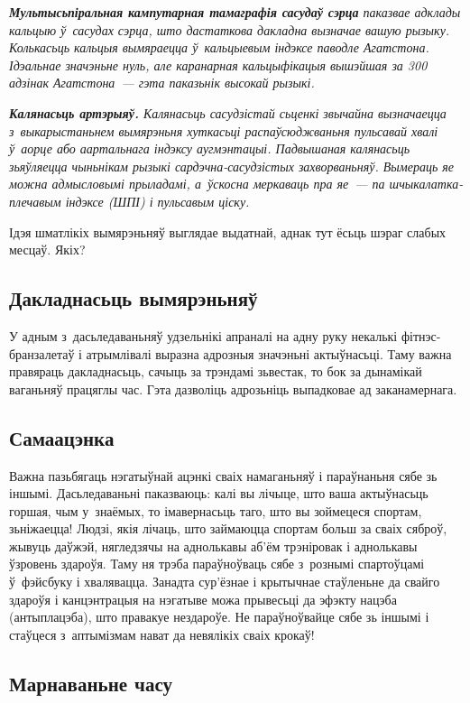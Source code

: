 \emph{\textbf{Мультысьпіральная кампутарная тамаграфія сасудаў сэрца} паказвае адклады кальцыю ў~сасудах сэрца, што дастаткова дакладна вызначае вашую рызыку. Колькасьць кальцыя вымяраецца ў~кальцыевым індэксе паводле Агатстона. Ідэальнае значэньне нуль, але каранарная кальцыфікацыя вышэйшая за 300 адзінак Агатстона~--- гэта паказьнік высокай рызыкі.}

\emph{\textbf{Калянасьць артэрыяў.} Калянасьць сасудзістай сьценкі звычайна вызначаецца з~выкарыстаньнем вымярэньня хуткасьці распаўсюджваньня пульсавай хвалі ў~аорце або аартальнага індэксу аугмэнтацыі. Падвышаная калянасьць зьяўляецца чыньнікам рызыкі сардэчна-сасудзістых захворваньняў. Вымераць яе можна адмысловымі прыладамі, а~ўскосна меркаваць пра яе~--- па шчыкалатка-плечавым індэксе (ШПІ) і пульсавым ціску.}

Ідэя шматлікіх вымярэньняў выглядае выдатнай, аднак тут ёсьць шэраг слабых месцаў. Якіх?

\subsection*{Дакладнасьць вымярэньняў}

У адным з~дасьледаваньняў удзельнікі апраналі на адну руку некалькі фітнэс-бранзалетаў і атрымлівалі выразна адрозныя значэньні актыўнасьці. Таму важна правяраць дакладнасьць, сачыць за трэндамі зьвестак, то бок за дынамікай ваганьняў працяглы час. Гэта дазволіць адрозьніць выпадковае ад заканамернага.

\subsection*{Самаацэнка}

Важна пазьбягаць нэгатыўнай ацэнкі сваіх намаганьняў і параўнаньня сябе зь іншымі. Дасьледаваньні паказваюць: калі вы лічыце, што ваша актыўнасьць горшая, чым у~знаёмых, то імавернасьць таго, што вы зоймецеся спортам, зьніжаецца! Людзі, якія лічаць, што займаюцца спортам больш за сваіх сяброў, жывуць даўжэй, нягледзячы на аднолькавы аб'ём трэніровак і аднолькавы ўзровень здароўя. Таму ня трэба параўноўваць сябе з~рознымі спартоўцамі ў~фэйсбуку і хвалявацца. Занадта сур'ёзнае і крытычнае стаўленьне да свайго здароўя і канцэнтрацыя на нэгатыве можа прывесьці да эфэкту нацэба (антыплацэба), што правакуе нездароўе. Не параўноўвайце сябе зь іншымі і стаўцеся з~аптымізмам нават да невялікіх сваіх крокаў!

\subsection*{Марнаваньне часу}

